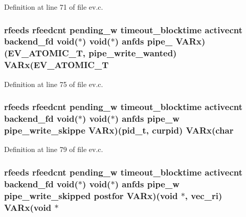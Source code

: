 \-Definition at line 71 of file ev.\-c.

\hypertarget{structev__loop_a6aa51983436c29dfa320a63ec7403f0b}{
\subsubsection[{\-V\-A\-Rx}]{ {\bf rfeeds} {\bf rfeedcnt} {\bf pending\-\_\-w} {\bf timeout\-\_\-blocktime} {\bf activecnt} {\bf backend\-\_\-fd} void($\ast$) void($\ast$) {\bf anfds} pipe\-\_\- {\bf \-V\-A\-Rx})(\-E\-V\-\_\-\-A\-T\-O\-M\-I\-C\-\_\-\-T, {\bf pipe\-\_\-write\-\_\-wanted}) {\bf \-V\-A\-Rx}(\-E\-V\-\_\-\-A\-T\-O\-M\-I\-C\-\_\-\-T}}\label{structev__loop_a6aa51983436c29dfa320a63ec7403f0b}


\-Definition at line 75 of file ev.\-c.

\hypertarget{structev__loop_ae8420c06a798ba710eb5de5fe2d0f0d7}{
\subsubsection[{\-V\-A\-Rx}]{ {\bf rfeeds} {\bf rfeedcnt} {\bf pending\-\_\-w} {\bf timeout\-\_\-blocktime} {\bf activecnt} {\bf backend\-\_\-fd} void($\ast$) void($\ast$) {\bf anfds} {\bf pipe\-\_\-w} pipe\-\_\-write\-\_\-skippe {\bf \-V\-A\-Rx})(pid\-\_\-t, {\bf curpid}) {\bf \-V\-A\-Rx}(char}}\label{structev__loop_ae8420c06a798ba710eb5de5fe2d0f0d7}


\-Definition at line 79 of file ev.\-c.

\hypertarget{structev__loop_abbc51e970555f9c7b979955ceee24593}{
\subsubsection[{\-V\-A\-Rx}]{ {\bf rfeeds} {\bf rfeedcnt} {\bf pending\-\_\-w} {\bf timeout\-\_\-blocktime} {\bf activecnt} {\bf backend\-\_\-fd} void($\ast$) void($\ast$) {\bf anfds} {\bf pipe\-\_\-w} {\bf pipe\-\_\-write\-\_\-skipped} postfor {\bf \-V\-A\-Rx})(void $\ast$, {\bf vec\-\_\-ri}) {\bf \-V\-A\-Rx}(void $\ast$}}\label{structev__loop_abbc51e970555f9c7b979955ceee24593}


